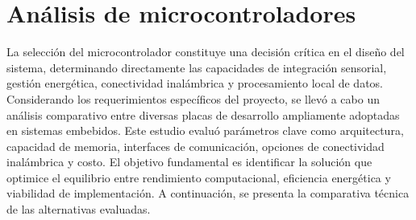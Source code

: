 

\section{Análisis de microcontroladores} 
\label{sec:analisis_microcontroladores}   
La selección del microcontrolador constituye una decisión crítica en el diseño del sistema, determinando directamente las capacidades de integración sensorial, gestión energética, conectividad inalámbrica y procesamiento local de datos. Considerando los requerimientos específicos del proyecto, se llevó a cabo un análisis comparativo entre diversas placas de desarrollo ampliamente adoptadas en sistemas embebidos. Este estudio evaluó parámetros clave como arquitectura, capacidad de memoria, interfaces de comunicación, opciones de conectividad inalámbrica y costo. El objetivo fundamental es identificar la solución que optimice el equilibrio entre rendimiento computacional, eficiencia energética y viabilidad de implementación. A continuación, se presenta la comparativa técnica de las alternativas evaluadas.  

 

\begin{table}[H]
\centering
\caption{Comparativa de microcontroladores para nodos fluviales}
\end{table}

